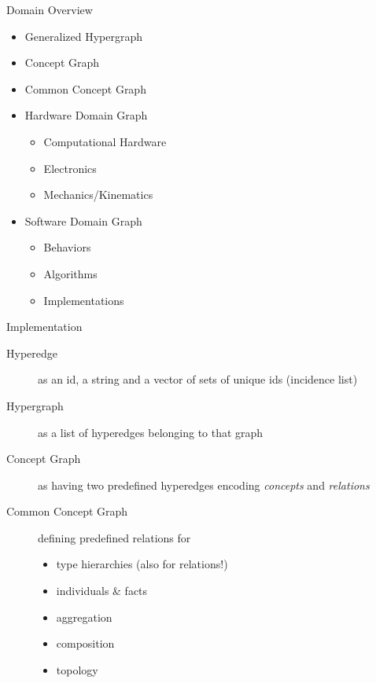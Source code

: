 \documentclass[pdf]
{beamer}
\begin{document}
\begin{frame}{Domain Overview}
    \begin{itemize}
        \item Generalized Hypergraph
        \item Concept Graph
        \item Common Concept Graph
        \item Hardware Domain Graph
        \begin{itemize}
            \item Computational Hardware
            \item Electronics
            \item Mechanics/Kinematics
        \end{itemize}
        \item Software Domain Graph
        \begin{itemize}
            \item Behaviors
            \item Algorithms
            \item Implementations
        \end{itemize}
    \end{itemize}
\end{frame}

\begin{frame}{Implementation}
    \begin{description}
    \item[Hyperedge] as an id, a string and a vector of sets of unique ids (incidence list)
    \item[Hypergraph] as a list of hyperedges belonging to that graph
    \item[Concept Graph] as having two predefined hyperedges encoding \emph{concepts} and \emph{relations}
    \item[Common Concept Graph] defining predefined relations for
        \begin{itemize}
        \item type hierarchies (also for relations!) %
        \item individuals \& facts %
        \item aggregation %
        \item composition %
        \item topology %
        \end{itemize}
    \end{description}
\end{frame}
\end{document}

